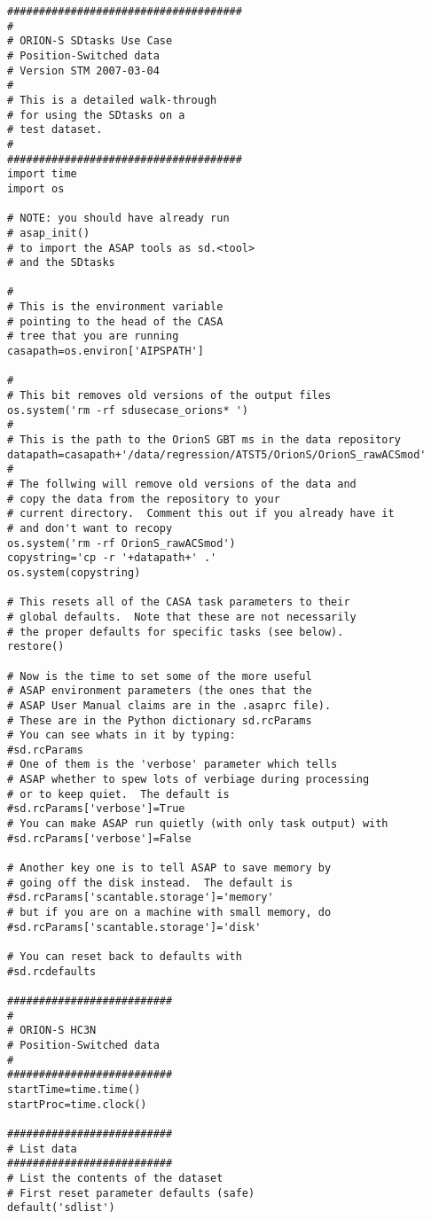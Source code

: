 \begin{verbatim}
#####################################
#
# ORION-S SDtasks Use Case
# Position-Switched data
# Version STM 2007-03-04
#
# This is a detailed walk-through
# for using the SDtasks on a
# test dataset.
#
#####################################
import time
import os

# NOTE: you should have already run
# asap_init()
# to import the ASAP tools as sd.<tool>
# and the SDtasks

#
# This is the environment variable
# pointing to the head of the CASA
# tree that you are running
casapath=os.environ['AIPSPATH']

#
# This bit removes old versions of the output files
os.system('rm -rf sdusecase_orions* ')
#
# This is the path to the OrionS GBT ms in the data repository
datapath=casapath+'/data/regression/ATST5/OrionS/OrionS_rawACSmod'
#
# The follwing will remove old versions of the data and
# copy the data from the repository to your
# current directory.  Comment this out if you already have it
# and don't want to recopy
os.system('rm -rf OrionS_rawACSmod')
copystring='cp -r '+datapath+' .'
os.system(copystring)

# This resets all of the CASA task parameters to their
# global defaults.  Note that these are not necessarily
# the proper defaults for specific tasks (see below).
restore()

# Now is the time to set some of the more useful
# ASAP environment parameters (the ones that the
# ASAP User Manual claims are in the .asaprc file).
# These are in the Python dictionary sd.rcParams
# You can see whats in it by typing:
#sd.rcParams
# One of them is the 'verbose' parameter which tells
# ASAP whether to spew lots of verbiage during processing
# or to keep quiet.  The default is
#sd.rcParams['verbose']=True
# You can make ASAP run quietly (with only task output) with
#sd.rcParams['verbose']=False

# Another key one is to tell ASAP to save memory by
# going off the disk instead.  The default is
#sd.rcParams['scantable.storage']='memory'
# but if you are on a machine with small memory, do
#sd.rcParams['scantable.storage']='disk'

# You can reset back to defaults with
#sd.rcdefaults

##########################
#
# ORION-S HC3N
# Position-Switched data
#
##########################
startTime=time.time()
startProc=time.clock()

##########################
# List data
##########################
# List the contents of the dataset
# First reset parameter defaults (safe)
default('sdlist')


\end{verbatim}
